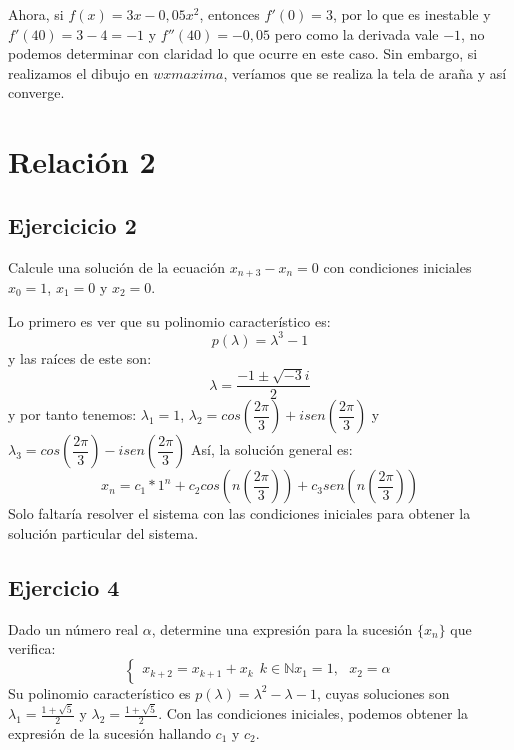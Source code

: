 \documentclass[11pt, a4paper]{article}
\newif\IfInSansMode
\theoremstyle{theorem-style}
\theoremstyle{definition-style}
\theoremstyle{remark-style}
\theoremstyle{example-style}
\begin{document}
    Ahora, si $f(x) = 3x - 0,05x^2$, entonces $f'(0) = 3$, por lo que es inestable y $f'(40) =3-4 = -1$ y $f''(40) = -0,05$
    pero como la derivada vale $-1$, no podemos determinar con claridad lo que ocurre en este caso. Sin embargo, si realizamos el dibujo en $wxmaxima$, veríamos que se realiza la tela de araña y así converge.




    \section{Relación 2}

    \subsection{Ejercicicio 2}
    Calcule una solución de la ecuación $x_ {n+3} -x_n = 0$ con condiciones iniciales $x_0 = 1$, $x_1 = 0$ y $x_2 = 0$.

    Lo primero es ver que su polinomio característico es:
    \[
        p(\lambda) = \lambda^3 -1
    \]
    y las raíces de este son:
    \[
        \lambda = \frac{-1 \pm \sqrt{-3}i}{2}
    \]
    y por tanto tenemos: $\lambda_1 = 1$, $\lambda_2 = cos(\dfrac{2\pi}{3})+ i sen(\dfrac{2\pi}{3})$ y $\lambda_3 = cos(\dfrac{2\pi}{3}) - i sen(\dfrac{2\pi}{3})$
    Así, la solución general es:
    \[
        x_n = c_1 * 1^n + c_2 cos(n(\dfrac{2\pi}{3})) + c_3 sen(n(\dfrac{2\pi}{3}))
    \]
    Solo faltaría resolver el sistema con las condiciones iniciales para obtener la solución particular del sistema.


    \subsection{Ejercicio 4}
    Dado un número real $\alpha$, determine una expresión para la sucesión $\{x_n\}$ que verifica:
    \[
        \begin{cases}
            x_{k+2} = x _{k+1} + x_k \ \ k \in \mathbb N
            x_1 = 1, \ \ \ x_2 = \alpha
        \end{cases}
    \]
    Su polinomio característico es $p(\lambda) = \lambda^2 - \lambda - 1$, cuyas soluciones son $\lambda_1 = \frac{1+\sqrt 5}{2}$ y $\lambda_2 = \frac{1+ \sqrt 5}{2}$. Con las condiciones iniciales, podemos obtener la expresión de la sucesión hallando $c_1$ y $c_2$.
\end{document}
